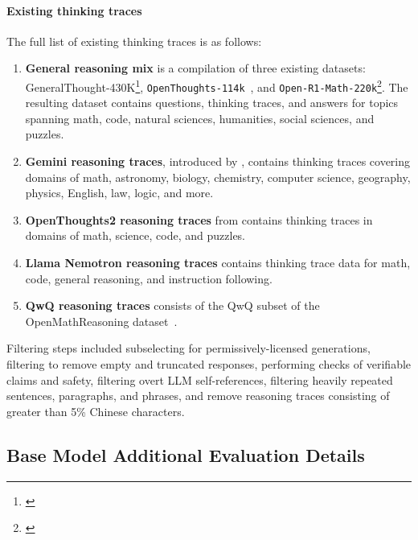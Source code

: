 \documentclass[table]{ai2style/ai2}
\begin{document}
{{\paragraph{Existing thinking traces}
The full list of existing thinking traces is as follows:

\begin{enumerate}
    \item \textbf{General reasoning mix} is a compilation of three existing datasets: GeneralThought-430K\footnote{\href{https://huggingface.co/datasets/RJT1990/GeneralThoughtArchive}{}}, \texttt{OpenThoughts-114k}~\citep{guha2025openthoughtsdatarecipesreasoning}, and \texttt{Open-R1-Math-220k}\footnote{\href{https://huggingface.co/datasets/open-r1/OpenR1-Math-220k}{}}. The resulting dataset contains questions, thinking traces, and answers for topics spanning math, code, natural sciences, humanities, social sciences, and puzzles.
    \item \textbf{Gemini reasoning traces}, introduced by \citet{muennighoff2025s1simpletesttimescaling}, contains thinking traces covering domains of math, astronomy, biology, chemistry, computer science, geography, physics, English, law, logic, and more.
    \item \textbf{OpenThoughts2 reasoning traces} from \citet{guha2025openthoughtsdatarecipesreasoning} contains thinking traces in domains of math, science, code, and puzzles.
    \item \textbf{Llama Nemotron reasoning traces} \citep{bercovich2025llamanemotronefficientreasoningmodels} contains thinking trace data for math, code, general reasoning, and instruction following.
    \item \textbf{QwQ reasoning traces} consists of the QwQ subset of the OpenMathReasoning dataset~\citep{moshkov2025aimo2}.
\end{enumerate}

Filtering steps included subselecting for permissively-licensed generations, filtering to remove empty and truncated responses, performing checks of verifiable claims and safety, filtering overt LLM self-references, filtering heavily repeated sentences, paragraphs, and phrases, and remove reasoning traces consisting of greater than 5\% Chinese characters.

\subsection{Base Model Additional Evaluation Details}
\label{sec:eval-suite}

}}
\end{document}
